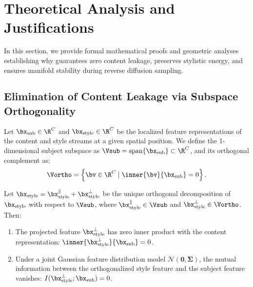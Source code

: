 \section{Theoretical Analysis and Justifications}
\label{sec:theory}

In this section, we provide formal mathematical proofs and geometric analyses establishing why \method guarantees zero content leakage, preserves stylistic energy, and ensures manifold stability during reverse diffusion sampling.

\subsection{Elimination of Content Leakage via Subspace Orthogonality}
\label{subsec:proof_leakage}

Let $\bx_{\text{sub}} \in \R^C$ and $\bx_{\text{style}} \in \R^C$ be the localized feature representations of the content and style streams at a given spatial position. We define the 1-dimensional subject subspace as $\Vsub = \text{span}\{\bx_{\text{sub}}\} \subset \R^C$, and its orthogonal complement as:
\begin{equation}
    \Vortho = \left\{ \bv \in \R^C \mid \inner{\bv}{\bx_{\text{sub}}} = 0 \right\}.
\end{equation}

\begin{theorem}
\label{thm:leakage}
Let $\bx_{\text{style}} = \bx_{\text{style}}^\parallel + \bx_{\text{style}}^\perp$ be the unique orthogonal decomposition of $\bx_{\text{style}}$ with respect to $\Vsub$, where $\bx_{\text{style}}^\parallel \in \Vsub$ and $\bx_{\text{style}}^\perp \in \Vortho$. Then:
\begin{enumerate}
    \item The projected feature $\bx_{\text{style}}^\perp$ has zero inner product with the content representation: $\inner{\bx_{\text{style}}^\perp}{\bx_{\text{sub}}} = 0$.
    \item Under a joint Gaussian feature distribution model $\mathcal{N}(\boldsymbol{0}, \boldsymbol{\Sigma})$, the mutual information between the orthogonalized style feature and the subject feature vanishes: $I(\bx_{\text{style}}^\perp; \bx_{\text{sub}}) = 0$.
\end{enumerate}
\end{theorem}

